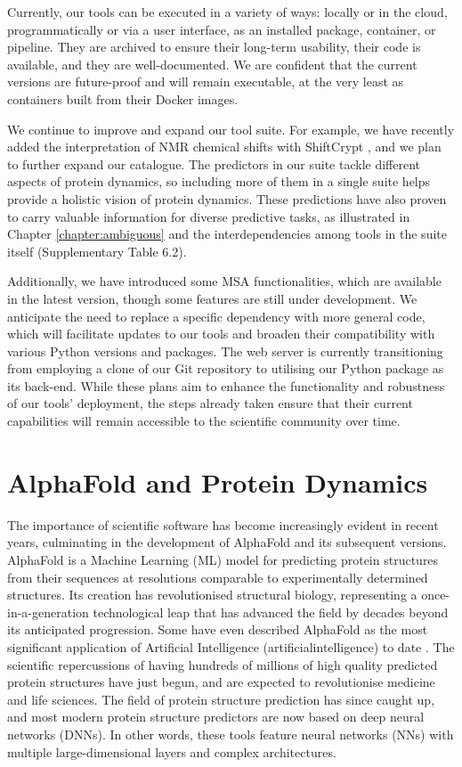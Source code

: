 Currently, our tools can be executed in a variety of ways: locally or in the cloud, programmatically or via a user interface, as an installed package, container, or pipeline. They are archived to ensure their long-term usability, their code is available, and they are well-documented. We are confident that the current versions are future-proof and will remain executable, at the very least as containers built from their Docker images.

We continue to improve and expand our tool suite. For example, we have recently added the interpretation of NMR chemical shifts with ShiftCrypt \cite{orlando_shiftcrypt_2020}, and we plan to further expand our catalogue. The predictors in our suite tackle different aspects of protein \gls{dynamics}, so including more of them in a single suite helps provide a holistic vision of protein \gls{dynamics}. These predictions have also proven to carry valuable information for diverse predictive tasks, as illustrated in Chapter \ref{chapter:ambiguous} \cite{roca-martinez_challenges_2022} and the interdependencies among tools in the suite itself (Supplementary Table 6.2). 

Additionally, we have introduced some MSA functionalities, which are available in the latest version, though some features are still under development. We anticipate the need to replace a specific dependency with more general code, which will facilitate updates to our tools and broaden their compatibility with various Python versions and packages. The web server is currently transitioning from employing a clone of our Git repository to utilising our Python package as its back-end. While these plans aim to enhance the functionality and robustness of our tools' deployment, the steps already taken ensure that their current capabilities will remain accessible to the scientific community over time.

\section{AlphaFold and Protein Dynamics}

The importance of scientific software has become increasingly evident in recent years, culminating in the development of AlphaFold and its subsequent versions. AlphaFold is a Machine Learning (ML) model for predicting protein structures from their sequences at resolutions comparable to experimentally determined structures. Its creation has revolutionised structural biology, representing a once-in-a-generation technological leap that has advanced the field by decades beyond its anticipated progression. Some have even described AlphaFold as the most significant application of Artificial Intelligence (\gls{artificialintelligence}) to date \cite{toews_alphafold_nodate}. The scientific repercussions of having hundreds of millions of high quality predicted protein structures have just begun, and are expected to revolutionise medicine and life sciences. The field of protein structure prediction has since caught up, and most modern protein structure predictors are now based on deep neural networks (DNNs). In other words, these tools feature neural networks (NNs) with multiple large-dimensional layers and complex architectures.


